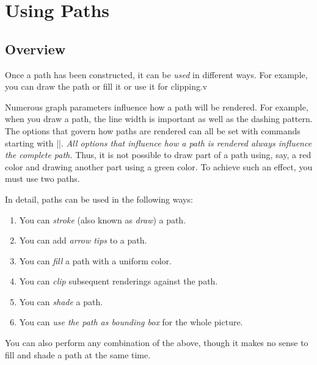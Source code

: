 %
%
%


\section{Using Paths}

\subsection{Overview}

Once a path has been constructed, it can be \emph{used} in different ways. For
example, you can draw the path or fill it or use it for clipping.v

Numerous graph parameters influence how a path will be rendered. For example,
when you draw a path, the line width is important as well as the dashing
pattern. The options that govern how paths are rendered can all be set with
commands starting with |\pgfset|. \emph{All options that influence how a path
is rendered always influence the complete path.} Thus, it is not possible to
draw part of a path using, say, a red color and drawing another part using a
green color. To achieve such an effect, you must use two paths.

In detail, paths can be used in the following ways:
%
\begin{enumerate}
    \item You can \emph{stroke} (also known as \emph{draw}) a path.
    \item You can add \emph{arrow tips} to a path.
    \item You can \emph{fill} a path with a uniform color.
    \item You can \emph{clip} subsequent renderings against the path.
    \item You can \emph{shade} a path.
    \item You can \emph{use the path as bounding box} for the whole picture.
\end{enumerate}
%
You can also perform any combination of the above, though it makes no sense to
fill and shade a path at the same time.

